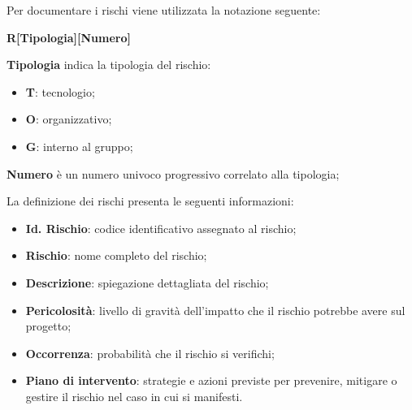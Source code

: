 Per documentare i rischi viene utilizzata la notazione seguente:
\begin{center}
    \textbf{R[Tipologia][Numero]}
\end{center}
\textbf{Tipologia} indica la tipologia del rischio:
\begin{itemize}
    \item \textbf{T}: tecnologio;
    \item \textbf{O}: organizzativo;
    \item \textbf{G}: interno al gruppo;
\end{itemize}
\textbf{Numero} è un numero univoco progressivo correlato alla tipologia;

La definizione dei rischi presenta le seguenti informazioni:
\begin{itemize}
    \item \textbf{Id. Rischio}: codice identificativo assegnato al rischio;
    \item \textbf{Rischio}: nome completo del rischio;
    \item \textbf{Descrizione}: spiegazione dettagliata del rischio;
    \item \textbf{Pericolosità}: livello di gravità dell’impatto che il rischio potrebbe avere sul progetto;
    \item \textbf{Occorrenza}: probabilità che il rischio si verifichi;
    \item \textbf{Piano di intervento}: strategie e azioni previste per prevenire, mitigare o gestire il rischio nel caso in cui si manifesti.
\end{itemize}